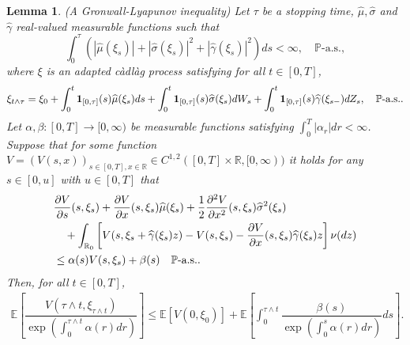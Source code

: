 \documentclass[11pt]{article}
\theoremstyle{theorem}
\newtheorem{Lem}[Def]{Lemma}
\theoremstyle{definition}
\newcommand{\bR}{\mathbb{R}}
\newcommand{\1}{{\bf 1}}
\begin{document}
\begin{Lem}

    \label{Lem2.4} (A Gronwall-Lyapunov inequality) 
Let $\tau $ be a stopping time,  $\widehat{\mu}, \widehat{\sigma}$ and $\widehat{\gamma}$ real-valued measurable functions such that 
\begin{equation} \label{eqn:hat}
\int_0^{\tau} \left(|\widehat{\mu} (\xi_s)| + |\widehat{\sigma}(\xi_s)|^2 + | \widehat{\gamma}(\xi_s)|^2 \right) ds <\infty, 
 \quad \mathbb{P}\text{-a.s.},
 \end{equation} 
 where  $\xi$ is an adapted  c\`adl\`ag process satisfying for all $t\in [0, T]$,   
 $$\xi_{t \wedge \tau } = \xi_0 + \int_0^t {\bf 1}_{[0, \tau]}(s)\widehat{\mu}(\xi _s)ds+ \int_0^t {\bf 1}_{[0, \tau]}(s)\widehat{\sigma}(\xi _s)dW_s + \int_0^t {\bf 1}_{[0, \tau]}(s)\widehat{\gamma}(\xi _{s-}) dZ_s, \quad  \mathbb{P} \text{-a.s.}.$$   
Let  $\alpha, \beta: [0, T] \to [0, \infty )$  be measurable functions  satisfying  $\int_0^{T}|\alpha_r|dr <\infty$. Suppose that for some function  $V=(V(s, x))_{s\in [0, T], x\in \mathbb{R}} \in C^{1,2}([0, T] \times \mathbb{R}, [0, \infty))$ it holds for any $s\in [0, u]$ with $u\in [0, T]$    that
\begin{align}
\label{Con2.4}
& \dfrac{\partial V}{\partial s} (s, \xi_s) + \dfrac{\partial V}{\partial x} (s, \xi_s) \widehat{\mu}(\xi_s)+\dfrac{1}{2}\frac{\partial^2 V}{\partial x^2}(s, \xi_s)\widehat{\sigma}^2(\xi_s)  \notag \\
& \quad + \int_{\bR_0} \left[ V(s, \xi_s+ \widehat{\gamma}(\xi_{s})z)-V(s, \xi_s) - \dfrac{\partial V}{\partial x} (s, \xi_s) \widehat{\gamma}( \xi_{s})z \right] \nu (dz)  \notag \\
& \leq \alpha(s) V(s, \xi_s)+  \beta(s) \quad \mathbb{P} \text{-a.s.}.
\end{align}
Then, for all $t \in [0, T]$, 
\begin{align*}
\mathbb{E} \left[ \dfrac{V(\tau \wedge t, \xi_{\tau \wedge t})}{\exp \left( \int_0^{\tau \wedge t} \alpha(r)dr\right)}\right] \leq \mathbb{E}[V(0, \xi_0)]  + \mathbb{E} \left[ \int_0^{\tau \land t}  \dfrac{\beta(s)}{\exp \left( \int_0^{s} \alpha(r) dr \right)}ds \right]. 
\end{align*}
\end{Lem}
\end{document}
